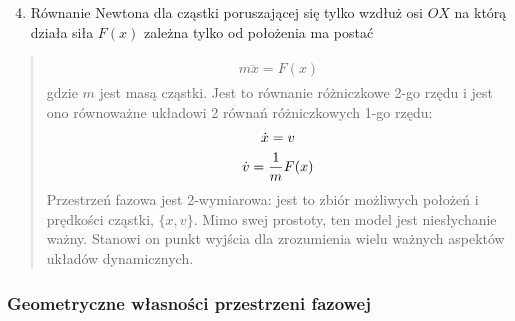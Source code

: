 \documentclass[a4paper,12pt,polish]{sphinxmanual}
\begin{document}
\begin{enumerate}
\setcounter{enumi}{3}
\item {} 
Równanie Newtona dla cząstki poruszającej się tylko wzdłuż osi $OX$ na którą działa siła $F(x)$ zależna tylko od położenia  ma postać

\end{enumerate}
\begin{quote}
\label{ch1/chI021:equation-eqn31}\begin{gather}
\begin{split}m \ddot x= F(x)\end{split}\label{ch1/chI021-eqn31}
\end{gather}
gdzie $m$ jest masą cząstki. Jest to równanie różniczkowe 2-go rzędu i jest ono  równoważne układowi 2 równań różniczkowych 1-go rzędu:
\label{ch1/chI021:equation-eqn32}\begin{gather}
\begin{split}\dot x = v\end{split}\label{ch1/chI021-eqn32}\\\begin{split}\dot v = \frac{1}{m} F(x)\end{split}\notag
\end{gather}
Przestrzeń fazowa  jest 2-wymiarowa: jest to zbiór możliwych położeń i prędkości cząstki, $\{x, v\}$.
Mimo swej prostoty, ten model jest niesłychanie ważny. Stanowi on punkt wyjścia dla zrozumienia wielu ważnych
aspektów układów dynamicznych.
\end{quote}


\subsubsection{Geometryczne własności przestrzeni fazowej}
\label{ch1/chI021:geometryczne-wlasnosci-przestrzeni-fazowej}
\end{document}
